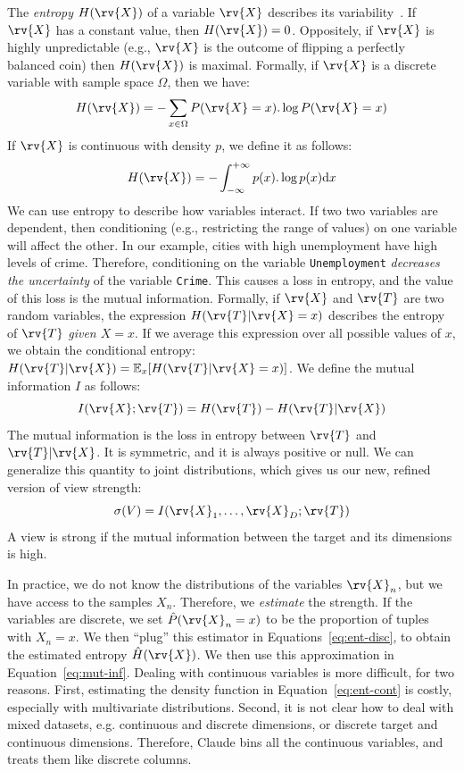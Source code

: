 The \emph{entropy} $H(\rv{X})$ of a variable $\rv{X}$ describes its
variabi\-lity~\cite{cover2012elements}. If $\rv{X}$ has a constant value, then $H(\rv{X}) = 0$.
Oppositely, if $\rv{X}$ is highly unpredictable (e.g., $\rv{X}$ is
the outcome of flipping a perfectly balanced coin) then $H(\rv{X})$ is
maximal. Formally, if $\rv{X}$ is a discrete variable with sample space
$\Omega$, then we have:
\begin{equation}\label{eq:ent-disc}
    H(\rv{X}) = - \sum_{x\in \Omega} P(\rv{X} = x).\log{P(\rv{X} = x)}
\end{equation}
If $\rv{X}$ is continuous with density $p$, we define it as follows:
\begin{equation}\label{eq:ent-cont}
    H(\rv{X}) = - \int_{-\infty}^{+\infty} p(x).\log{p(x)}\mathrm{d}x
\end{equation}
We can use entropy to describe how variables interact. If two two variables are
dependent, then conditioning (e.g., restricting the range of values) on one
variable will affect the other. In our example, cities with high unemployment
have high levels of crime.  Therefore, conditioning on the variable
\texttt{Unemployment} \emph{decreases the uncertainty} of the variable
\texttt{Crime}. This causes a loss in entropy, and the value of this loss is
the mutual information.  Formally, if $\rv{X}$ and $\rv{T}$ are two
random variables, the expression $H(\rv{T} | \rv{X} = x)$ describes the entropy
of $\rv{T}$ \emph{given $X = x$}. If we average this expression over all
possible values of $x$, we obtain the conditional entropy: $H(\rv{T}|\rv{X}) =
\mathbb{E}_{x} [H(\rv{T} | \rv{X} = x)]$. We define the mutual information $I$
as follows:
\begin{equation}\label{eq:mut-inf}
    I(\rv{X}; \rv{T}) = H(\rv{T}) - H(\rv{T} | \rv{X})
\end{equation}
The mutual information is the loss in entropy between $\rv{T}$ and $\rv{T} |
\rv{X}$. It is symmetric, and it is always positive or null. We can generalize
this quantity to joint distributions, which gives us our new, refined version of
view strength:
\begin{equation}\label{eq:strength}
    \sigma(V) = I(\rv{X}_1, \ldots, \rv{X}_D ; \rv{T})
\end{equation}
A view is strong if the mutual information between the target and its
dimensions is high.

In practice, we do not know the distributions of the variables $\rv{X}_n$, but
we have access to the samples $X_n$. Therefore, we \emph{estimate} the
strength. If the variables are discrete, we set $\hat{P}(\rv{X}_n = x)$ to be
the proportion of tuples with $X_n=x$. We then ``plug'' this estimator in
Equations~\ref{eq:ent-disc}, to obtain the estimated entropy $\hat{H}(\rv{X})$.
We then use this approximation in Equation~\ref{eq:mut-inf}.  Dealing with
continuous variables is more difficult, for two reasons. First, estimating the
density function in Equation~\ref{eq:ent-cont} is costly, especially with
multivariate distributions.  Second, it is not clear how to deal with mixed
datasets, e.g.  continuous and discrete dimensions, or discrete target and
continuous dimensions.  Therefore, Claude bins all the continuous variables,
and treats them like discrete columns.

